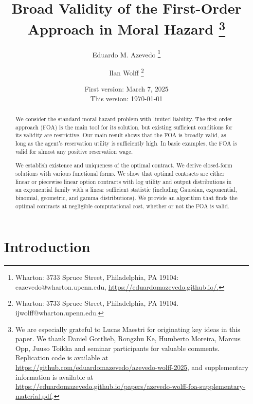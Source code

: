 \documentclass[12pt]{article}
\begin{document}
\title{Broad Validity of the First-Order Approach in Moral Hazard%
\thanks{We are especially grateful to Lucas Maestri for originating key ideas in this paper. We thank Daniel Gottlieb, Rongzhu Ke, Humberto Moreira, Marcus Opp, Juuso Toikka and seminar participants for valuable comments. Replication code is available at \url{https://github.com/eduardomazevedo/azevedo-wolff-2025}, and supplementary information is available at \url{https://eduardomazevedo.github.io/papers/azevedo-wolff-foa-supplementary-material.pdf}.}
}

\author{Eduardo M. Azevedo%
\thanks{Wharton: 3733 Spruce Street, Philadelphia, PA 19104: eazevedo@wharton.upenn.edu, \url{https://eduardomazevedo.github.io/.}}
\and Ilan Wolff%
\thanks{Wharton: 3733 Spruce Street, Philadelphia, PA 19104. ijwolff@wharton.upenn.edu.}
}

\date{
First version: March 7, 2025 \\
This version: \today}

\maketitle

\begin{abstract}%
We consider the standard moral hazard problem with limited liability. The first-order approach (FOA) is the main tool for its solution, but existing sufficient conditions for its validity are restrictive.
Our main result shows that the FOA is broadly valid, as long as the agent's reservation utility is sufficiently high.
In basic examples, the FOA is valid for almost any positive reservation wage.

We establish existence and uniqueness of the optimal contract. We derive closed-form solutions with various functional forms. We show that optimal contracts are either linear or piecewise linear option contracts with log utility and output distributions in an exponential family with a linear sufficient statistic (including Gaussian, exponential, binomial, geometric, and gamma distributions). We provide an algorithm that finds the optimal contracts at negligible computational cost, whether or not the FOA is valid.
%
\end{abstract}

\newpage

\section{Introduction}
\label{sec:introduction}

\end{document}
